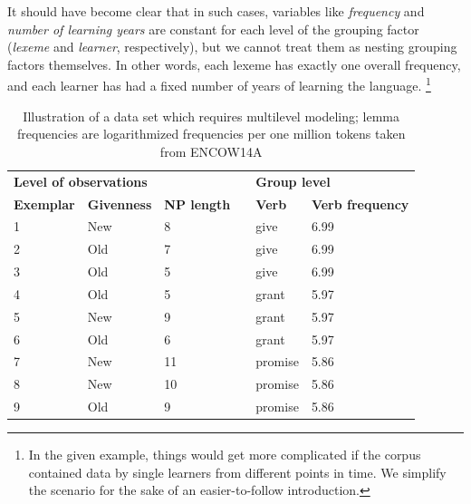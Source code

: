 \documentclass[a4paper,12pt]{article}
\begin{document}
It should have become clear that in such cases, variables like \textit{frequency} and \textit{number of learning years} are constant for each level of the grouping factor (\textit{lexeme} and \textit{learner}, respectively), but we cannot treat them as nesting grouping factors themselves.
In other words, each lexeme has exactly one overall frequency, and each learner has had a fixed number of years of learning the language.%
\footnote{In the given example, things would get more complicated if the corpus contained data by single learners from different points in time.
We simplify the scenario for the sake of an easier-to-follow introduction.}

\begin{table}
  \centering
  \begin{tabular}{lllp{0.5cm}ll}
    \toprule
    \multicolumn{3}{l}{\textbf{Level of observations}}    && \multicolumn{2}{l}{\textbf{Group level}} \\
    \textbf{Exemplar} & \textbf{Givenness} & \textbf{NP length} && \textbf{Verb} & \textbf{Verb frequency} \\
    \midrule
            1 &     New   &      8    &&    give   &   6.99    \\
            2 &     Old   &      7    &&    give   &   6.99    \\
            3 &     Old   &      5    &&    give   &   6.99    \\
            4 &     Old   &      5    &&    grant  &   5.97    \\
            5 &     New   &      9    &&    grant  &   5.97    \\
            6 &     Old   &      6    &&    grant  &   5.97    \\
            7 &     New   &      11   &&   promise &   5.86    \\
            8 &     New   &      10   &&   promise &   5.86    \\
            9 &     Old   &      9    &&   promise &   5.86    \\
    \bottomrule
  \end{tabular}
  \caption{Illustration of a data set which requires multilevel modeling; lemma frequencies are logarithmized frequencies per one million tokens taken from ENCOW14A}
  \label{tab:multilevel}
\end{table}
\end{document}
